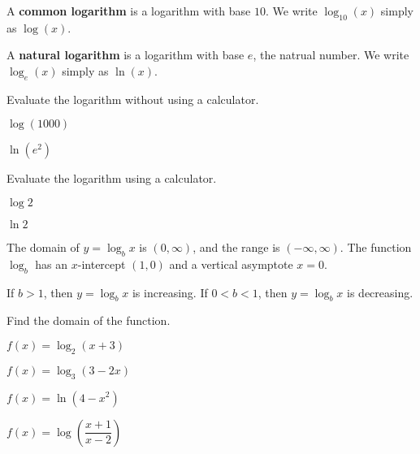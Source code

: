\newpage

\begin{definition}
  A \textbf{common logarithm} is a logarithm with base $10$. We write $\log_{10}(x)$ simply as $\log(x)$.
  
  A \textbf{natural logarithm} is a logarithm with base $e$, the natrual number. We write $\log_{e}(x)$ simply as $\ln(x)$.
\end{definition}

\begin{example}
  Evaluate the logarithm without using a calculator.\\
  \begin{enumerate*}
    \item $\log(1000)$
    \item $\ln(e^2)$\hfill\null
  \end{enumerate*}
\end{example}
\vspace*{-0.1\textheight}

\begin{example}
  Evaluate the logarithm using a calculator.\\
  \begin{enumerate*}
    \item $\log 2$
    \item $\ln 2$\hfill\null
  \end{enumerate*}
\end{example}

\vspace*{-0.1\textheight}

The domain of $y=\log_bx$ is $(0,\infty)$, and the range  is $(-\infty, \infty)$. The function $\log_b$ has an $x$-intercept $(1, 0)$ and a vertical asymptote $x=0$.

If $b>1$, then $y=\log_bx$ is increasing. If $0<b<1$, then $y=\log_bx$ is decreasing.

\begin{example}
  Find the domain of the function.\\
  \begin{enumerate*}
    \item $f(x)=\log_2(x+3)$
    \item $f(x)=\log_3(3-2x)$
    \item $f(x)=\ln(4-x^2)$
    \item $f(x)=\log\left(\dfrac{x+1}{x-2}\right)$\hfill\null
  \end{enumerate*}
\end{example}

